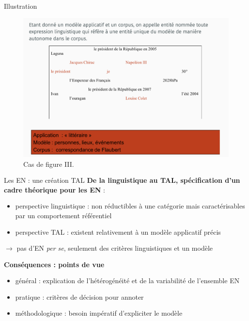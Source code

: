 \documentclass[xetex,xcolor={table,usenames,dvipsnames}]{beamer}
\begin{document}
\begin{frame}{Illustration}
						\begin{figure}[h] %
		\centering
		\includegraphics[width=.9\linewidth]{img/litteraire.png}
		\caption{Cas de figure \textsc{III}.}
		\label{fig:ling_out_TAL}
	\end{figure}
\end{frame}

\begin{frame}{Les \textsc{EN} : une création \textsc{TAL}}
	\textcolor{deepblue}{\textbf{De la linguistique au \textsc{TAL}, spécification d'un cadre théorique pour les \textsc{EN}}} :
	\begin{itemize}
		\item perspective linguistique : non réductibles à une catégorie mais caractérisables par un comportement référentiel
		\item perspective \textsc{TAL} : existent relativement à un modèle applicatif précis
	\end{itemize}
	$\rightarrow$ pas d'\textsc{EN} \textit{per se}, seulement des critères linguistiques et un modèle
	
	\textcolor{deepblue}{\textbf{Conséquences : points de vue}}
	\begin{itemize}
		\item général : explication de l'hétérogénéité et de la variabilité de l'ensemble \textsc{EN}
		\item pratique : critères de décision pour annoter
		\item méthodologique : besoin impératif d'expliciter le modèle
	\end{itemize}
\end{frame}
\end{document}
